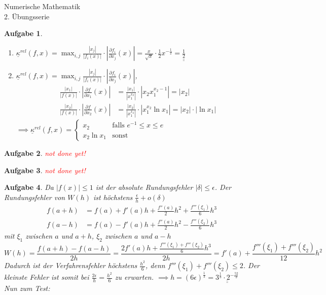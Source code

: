 \documentclass[11pt]{article}
\theoremstyle{break}
\newtheorem{task}{Aufgabe}
\newcommand{\abs}[1]{\ensuremath{\left\vert #1 \right\vert}}
\newcommand{\komp}{\ensuremath{\underline{\kappa}}}
\newcommand{\result}[1]{\ensuremath{\underline{\underline{#1}}}}
\newcommand{\ndy}{
    \textcolor{red} {\hfill not done yet!}
    \reversemarginpar
    \marginpar{\raggedleft\textcolor{red}{\rule{2mm}{2mm}}}
}
\newcommand{\hw}{2}
\begin{document}
\begin{center}
\Large{Numerische Mathematik}\\
\large{\hw. Übungsserie}
\end{center}
\begin{task}
    \hfill\vspace{-5mm}
    \begin{enumerate}[label={(\alph*)}]
        \item $\komp^{rel}(f,x) = \max_{i,j} \frac{\abs{x_j}}{\abs{f_i(x)}}\cdot\abs{\frac{\partial f_i}{\partial x_j}(x)} = \frac{x}{\sqrt{x}}\cdot \frac{1}{2} x^{-\frac{1}{2}}=\result{\frac{1}{2}}$
        \item $\komp^{rel}(f,x) = \max_{i,j} \frac{\abs{x_j}}{\abs{f_i(x)}}\cdot\abs{\frac{\partial f_i}{\partial x_j}(x)}$,
        \begin{align*}
            \frac{\abs{x_1}}{\abs{f(x)}}\cdot\abs{\frac{\partial f}{\partial x_1}(x)} &= \frac{\abs{x_1}}{\abs{x_1^{x_2}}}\cdot \abs{ x_2 x_1^{x_2 -1}}=\abs{x_2}\\
            \frac{\abs{x_2}}{\abs{f(x)}}\cdot\abs{\frac{\partial f}{\partial x_2}(x)} &= \frac{\abs{x_2}}{\abs{x_1^{x_2}}}\cdot \abs{ x_1^{x_2}\ln x_1}=\abs{x_2}\cdot\abs{\ln x_1}
        \end{align*}
        $\implies \komp^{rel}(f,x) = \begin{cases}
            x_2 & \text{falls } e^{-1} \leq x \leq e\\
            x_2\ln x_1 & \text{sonst}
        \end{cases}$
    \end{enumerate}
\end{task}
\begin{task}
    \ndy
\end{task}

\begin{task}
    \ndy
\end{task}

\begin{task}
    Da $\abs{f(x)}\leq 1$ ist der absolute Rundungsfehler $\abs{\delta} \leq \epsilon$.
    Der Rundungsfehler von $W(h)$ ist höchstens $\frac{\epsilon}{h}+o(\delta)$
    \begin{align*}
        f(a + h) &= f(a) + f'(a) h + \frac{f''(a)}{2} h^2 + \frac{f'''(\xi_1)}{6}h^3\\
        f(a - h) &= f(a) - f'(a) h + \frac{f''(a)}{2} h^2 - \frac{f'''(\xi_2)}{6}h^3
    \end{align*}
    mit $\xi_1$ zwischen $a$ und $a+h$, $\xi_2$ zwischen $a$ und $a-h$
        $$W(h) = \frac{f(a+h) - f(a-h)}{2h} = \frac{2f'(a) h + \frac{f'''(\xi_1) + f'''(\xi_2)}{6}h^3}{2h} = f'(a) + \frac{f'''(\xi_1) + f'''(\xi_2)}{12}h^2$$
    Dadurch ist der Verfahrensfehler höchstens $\frac{h^2}{6}$, denn $f'''(\xi_1) + f'''(\xi_2)\leq 2$.
    Der kleinste Fehler ist somit bei $\frac{2\epsilon}{h}=\frac{h^2}{6}$ zu erwarten. 
    $\implies h=(6\epsilon)^\frac{1}{3} = \result{3^\frac{1}{3}\cdot 2^{-\frac{52}{3}}}$\vspace{3mm}\\
    Nun zum Test:
\end{task}
\end{document}
